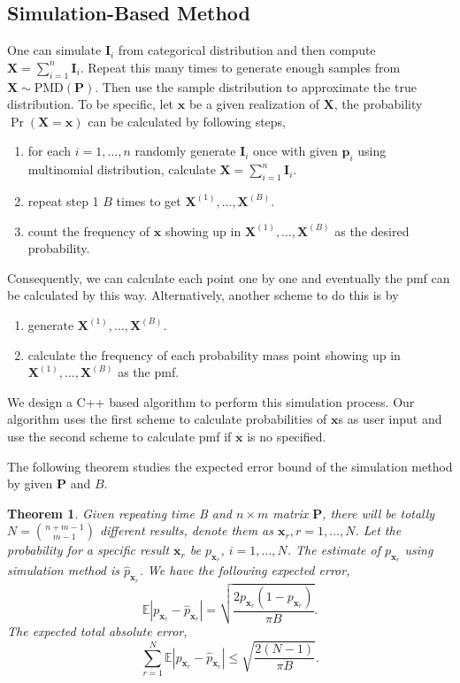 \documentclass[12pt]{article}
\newcommand{\Ivec}{{\boldsymbol{I}}}
\newcommand{\EE}{\mathbb{E}}
\newcommand{\Pmat}{\mathbf{P}}
\newcommand{\pvec}{\boldsymbol{p}}
\newcommand{\PMD}{\textrm{PMD}}
\newcommand{\wh}{\widehat}
\newcommand{\Xvec}{\boldsymbol{X}}
\newcommand{\xvec}{\boldsymbol{x}}
\newtheorem{thm}{Theorem}
\begin{document}
\subsection{Simulation-Based Method}
One can simulate $\Ivec_i$ from categorical distribution and then compute $\Xvec = \sum_{i=1}^{n}\Ivec_i$. Repeat this many times to generate enough samples from $\Xvec \sim \PMD(\Pmat)$. Then use the sample distribution to approximate the true distribution. To be specific, let $\xvec$ be a given realization of $\Xvec$, the probability $\Pr(\Xvec=\xvec)$ can be calculated by following steps,
\begin{enumerate}[Step 1]
    \item for each $i=1,\dots,n$ randomly generate $\Ivec_i$ once with given $\pvec_i$ using multinomial distribution, calculate $\Xvec = \sum_{i=1}^{n}\Ivec_i$.
    \item repeat step 1 $B$ times to get $\Xvec^{(1)},\dots,\Xvec^{(B)}.$
    \item count the frequency of $\xvec$ showing up in $\Xvec^{(1)},\dots,\Xvec^{(B)}$ as the desired probability.
\end{enumerate}
Consequently, we can calculate each point one by one and eventually the pmf can be calculated by this way. Alternatively, another scheme to do this is by
\begin{enumerate}[Step 1]
	\item generate $\Xvec^{(1)},\dots,\Xvec^{(B)}$.
	\item calculate the frequency of each probability mass point showing up in $\Xvec^{(1)},\dots,\Xvec^{(B)}$ as the pmf.
\end{enumerate}

We design a C++ based algorithm to perform this simulation process. Our algorithm uses the first scheme to calculate probabilities of $\xvec$s as user input  and use the second scheme to calculate pmf if $\xvec$ is no specified.

The following theorem studies the expected error bound of the simulation method by given $\Pmat$ and $B$.
\begin{thm}
Given repeating time \mbox{B} and $n \times m$ matrix $\Pmat$, there will be totally  $N=\binom{n+m-1}{m-1}$ different results, denote them as  $\xvec_r, r=1,\dots,N$. Let the probability for a specific result $\xvec_{r}$ be $p_{\xvec_{r}}$, $i=1,\dots,N$. The estimate of  $p_{\xvec_{r}}$ using simulation method is $\wh{p}_{\xvec_r}$. We have the following expected error,
\begin{equation*}
    \EE|p_{\xvec_r} - \wh{p}_{\xvec_r}| =  \sqrt{\frac{2 p_{\xvec_r}(1-p_{\xvec_r})}{\pi B}}.
\end{equation*}
The expected total absolute error,
$$\sum_{r=1}^{N} \EE|p_{\xvec_r} - \wh{p}_{\xvec_r}| \leq \sqrt{\frac{2(N-1)}{\pi B}}.$$
\end{thm}
\end{document}
